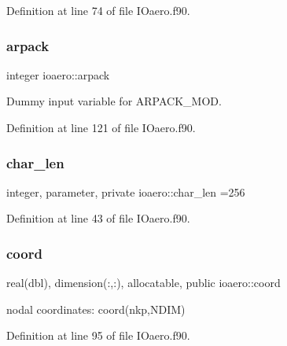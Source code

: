 Definition at line 74 of file I\+Oaero.\+f90.

\mbox{\label{namespaceioaero_a02839259538f3d7e305ebe79cb43d2c4}} 
\subsubsection{\texorpdfstring{arpack}{arpack}}
{\footnotesize\ttfamily integer ioaero\+::arpack\hspace{0.3cm}{\ttfamily [private]}}



Dummy input variable for A\+R\+P\+A\+C\+K\+\_\+\+M\+OD. 



Definition at line 121 of file I\+Oaero.\+f90.

\mbox{\label{namespaceioaero_acd6bdfdcfd986fd1c26261e5996e3b03}} 
\subsubsection{\texorpdfstring{char\+\_\+len}{char\_len}}
{\footnotesize\ttfamily integer, parameter, private ioaero\+::char\+\_\+len =256\hspace{0.3cm}{\ttfamily [private]}}



Definition at line 43 of file I\+Oaero.\+f90.

\mbox{\label{namespaceioaero_ad67cddc00712c4d5a6d4008b2fe6c452}} 
\subsubsection{\texorpdfstring{coord}{coord}}
{\footnotesize\ttfamily real(dbl), dimension(\+:,\+:), allocatable, public ioaero\+::coord}



nodal coordinates\+: coord(nkp,\+N\+D\+I\+M) 



Definition at line 95 of file I\+Oaero.\+f90.

\mbox{\label{namespaceioaero_ab2bc17b64328528015d161cab6490b80}} 
